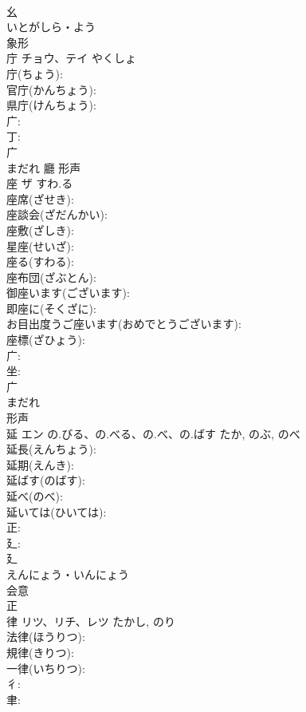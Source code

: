 \documentclass[8pt]{extreport}
\begin{document}
\begin{CJK}{UTF8}{min}
\\	幺	
\\	いとがしら・よう	
\\	象形 
\\	庁	チョウ、テイ	やくしょ		
\\	庁(ちょう): 
\\	官庁(かんちょう): 
\\	県庁(けんちょう): 
\\	广: 
\\	丁: 
\\	广	
\\	まだれ	廳	形声 
\\	座	ザ	すわ.る		
\\	座席(ざせき): 
\\	座談会(ざだんかい): 
\\	座敷(ざしき): 
\\	星座(せいざ): 
\\	座る(すわる): 
\\	座布団(ざぶとん): 
\\	御座います(ございます): 
\\	即座に(そくざに): 
\\	お目出度うご座います(おめでとうございます): 
\\	座標(ざひょう): 
\\	广: 
\\	坐: 
\\	广	
\\	まだれ	
\\	形声 
\\	延	エン	の.びる、の.べる、の.べ、の.ばす	たか, のぶ, のべ	
\\	延長(えんちょう): 
\\	延期(えんき): 
\\	延ばす(のばす): 
\\	延べ(のべ): 
\\	延いては(ひいては): 
\\	正: 
\\	廴: 
\\	廴	
\\	えんにょう・いんにょう	
\\	会意 
\\	正 
\\	律	リツ、リチ、レツ		たかし, のり	
\\	法律(ほうりつ): 
\\	規律(きりつ): 
\\	一律(いちりつ): 
\\	彳: 
\\	聿: 

\end{CJK}
\end{document}

